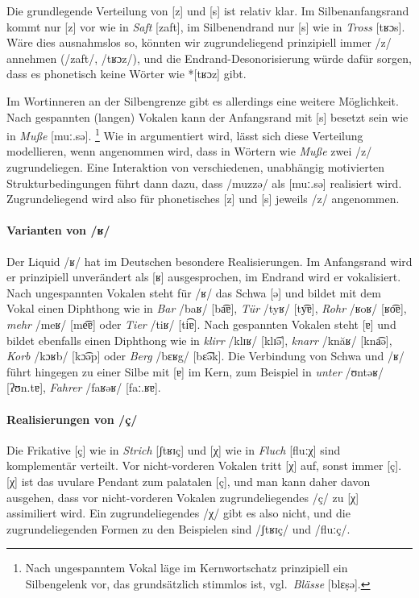 Die grundlegende Verteilung von [z] und [s] ist relativ klar.
Im Silbenanfangsrand kommt nur [z] vor wie in \textit{Saft} [zaft], im Silbenendrand nur [s] wie in \textit{Tross} [tʁɔs].
Wäre dies ausnahmslos so, könnten wir zugrundeliegend prinzipiell immer /z/ annehmen (/zaft/, /tʁɔz/), und die Endrand-Desonorisierung würde dafür sorgen, dass es phonetisch keine Wörter wie *[tʁɔz] gibt.

Im Wortinneren an der Silbengrenze gibt es allerdings eine weitere Möglichkeit.
Nach gespannten (langen) Vokalen kann der Anfangsrand mit [s] besetzt sein wie in \textit{Muße} [muː.sə].%
\footnote{Nach ungespanntem Vokal läge im Kernwortschatz prinzipiell ein Silbengelenk vor, das grundsätzlich stimmlos ist, vgl.\ \textit{Blässe} [blɛṣə].}
Wie in  argumentiert wird, lässt sich diese Verteilung modellieren, wenn angenommen wird, dass in Wörtern wie \textit{Muße} zwei /z/ zugrundeliegen.
Eine Interaktion von verschiedenen, unabhängig motivierten Strukturbedingungen führt dann dazu, dass /muzzə/ als [muː.sə] realisiert wird.
Zugrundeliegend wird also für phonetisches [z] und [s] jeweils /z/ angenommen.

\paragraph*{Varianten von /ʁ/}

Der Liquid /ʁ/ hat im Deutschen besondere Realisierungen.
Im Anfangsrand wird er prinzipiell unverändert als [ʁ] ausgesprochen, im Endrand wird er vokalisiert.
Nach ungespannten Vokalen steht für /ʁ/ das Schwa [ə] und bildet mit dem Vokal einen Diphthong wie in \textit{Bar} /baʁ/ [ba͡ɐ], \textit{Tür} /tyʁ/ [ty͡ɐ], \textit{Rohr} /ʁoʁ/ [ʁo͡ɐ], \textit{mehr} /meʁ/ [me͡ɐ] oder \textit{Tier} /tiʁ/ [ti͡ɐ].
Nach gespannten Vokalen steht [ɐ] und bildet ebenfalls einen Diphthong wie in \textit{klirr} /klɪʁ/ [klɪ͡ə], \textit{knarr} /knăʁ/ [kna͡ə], \textit{Korb} /kɔʁb/ [kɔ͡əp] oder \textit{Berg} /bɛʁg/ [bɛ͡ək].
Die Verbindung von Schwa und /ʁ/ führt hingegen zu einer Silbe mit [ɐ] im Kern, zum Beispiel in \textit{unter} /ʊntəʁ/ [ʔʊn.tɐ], \textit{Fahrer} /faʁəʁ/ [faː.ʁɐ].

\paragraph*{Realisierungen von /ç/}

Die Frikative [ç] wie in \textit{Strich} [ʃtʁɪç] und [χ] wie in \textit{Fluch} [fluːχ] sind komplementär verteilt.
Vor nicht-vorderen Vokalen tritt [χ] auf, sonst immer [ç].
[χ] ist das uvulare Pendant zum palatalen [ç], und man kann daher davon ausgehen, dass vor nicht-vorderen Vokalen zugrundeliegendes /ç/ zu [χ] assimiliert wird.
Ein zugrundeliegendes /χ/ gibt es also nicht, und die zugrundeliegenden Formen zu den Beispielen sind /ʃtʁɪç/ und /fluːç/.

